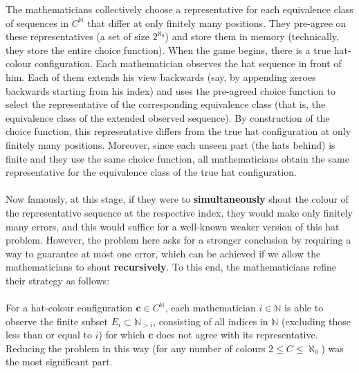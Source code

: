 \documentclass[11pt, a4paper, oneside]{article}
\theoremstyle{remark}
\theoremstyle{lemma}
\begin{document}
The mathematicians collectively choose a representative for each equivalence class of sequences in \(C^{\mathbb{N}}\) that differ at only finitely many positions. They pre-agree on these representatives (a set of size \(2^{\aleph_0}\)) and store them in memory (technically, they store the entire choice function). When the game begins, there is a true hat-colour configuration. Each mathematician observes the hat sequence in front of him. Each of them extends his view backwards (say, by appending zeroes backwards starting from his index) and uses the pre-agreed choice function to select the representative of the corresponding equivalence class (that is, the equivalence class of the extended observed sequence). By construction of the choice function, this representative differs from the true hat configuration at only finitely many positions. Moreover, since each unseen part (the hats behind) is finite and they use the same choice function, all mathematicians obtain the same representative for the equivalence class of the true hat configuration.
\\\\
Now famously, at this stage, if they were to \textbf{simultaneously} shout the colour of the representative sequence at the respective index, they would make only finitely many errors, and this would suffice for a well-known weaker version of this hat problem. However, the problem here asks for a stronger conclusion by requiring a way to guarantee at most one error, which can be achieved if we allow the mathematicians to shout \textbf{recursively}. To this end, the mathematicians refine their strategy as follows:
\\\\
For a hat-colour configuration \( \mathbf{c} \in C^{\mathbb{N}} \), each mathematician \( i \in \mathbb{N} \) is able to observe the finite subset \( E_i \subset \mathbb{N}_{>i} \), consisting of all indices in \( \mathbb{N} \) (excluding those less than or equal to \( i \)) for which \( \mathbf{c} \) does not agree with its representative. Reducing the problem in this way (for any number of colours \( 2 \leq C \leq \aleph_0 \)) was the most significant part.
\\\\
\end{document}
